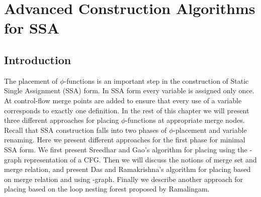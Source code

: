 \chapter{Advanced Construction Algorithms for SSA
   }
\label{chapter:alternative_ssa_construction_algorithms}

{

\def\p{$\phi$}
\def\st#1{\rlap{\raisebox{3.4pt}{\kern3pt{\scriptsize\it #1}}}{\rightarrow}}
\def\stplus{\rlap{\raisebox{3.4pt}{\kern3pt{\scriptsize+}}}{\rightarrow}}
\def\St#1{\rlap{\raisebox{3.4pt}{\kern3pt{\scriptsize\it #1}}}{\Rightarrow}}
\def\level{\textit{level}}

\def\p{$\phi$}
\def\iDFac{\iDF\!\!_{\textit{ac}}}


\section{Introduction}

The  placement  of $\phi$-functions is an important step in the construction of Static Single Assignment (SSA) form.
In SSA form every variable is assigned 
only once. At control-flow merge points \phifuns are added to ensure that every use of a variable corresponds to exactly one definition. 
In the rest of this chapter we will present three different approaches  for placing $\phi$-functions
at appropriate merge nodes. Recall that SSA construction falls into two phases of $\phi$-placement and variable renaming. Here we present different approaches for the first phase for minimal SSA form. We first present Sreedhar and Gao's algorithm for
placing \phifuns using the \DJ-graph representation of a CFG.
Then we will discuss the notions of merge set and merge relation, and present Das and Ramakrishna's algorithm for placing \phifuns based on merge relation and using \DJ-graph. Finally we describe another approach for placing \phifuns based on the loop nesting forest proposed by Ramalingam.



}
